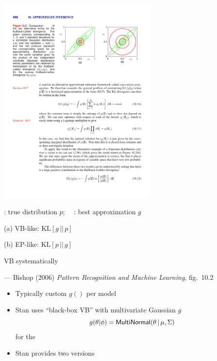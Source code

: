 \documentclass[10pt]{report}
\begin{document}
%
\vspace*{-4pt}
\begin{center}
\includegraphics[width=0.6\textwidth]{img/bishop-fig-10-2.pdf}
\end{center}
\vspace*{-10pt}
\begin{subitemize}
\item {}: true distribution $p$; \ \ : best
  approximation $g$
\begin{subitemize}
\item[(a)] VB-like: $\mbox{KL}[g \, || \, p]$
\item[(b)] EP-like: $\mbox{KL}[p \, || \, g]$
\end{subitemize}
\item VB systematically 
\end{subitemize}
\vfill \hfill
{\footnotesize  --- Bishop (2006) {\slshape Pattern Recognition and Machine Learning}, fig.~10.2}


%
\begin{itemize}
\item Typically custom $g()$ per model
\item Stan uses ``black-box VB'' with multivariate Gaussian $g$
\[
g(\theta|\phi) = \text{\sf MultiNormal}(\theta \, | \, \mu, \Sigma)
\]
for the 
\item Stan provides two versions
\end{itemize}
\end{document}
